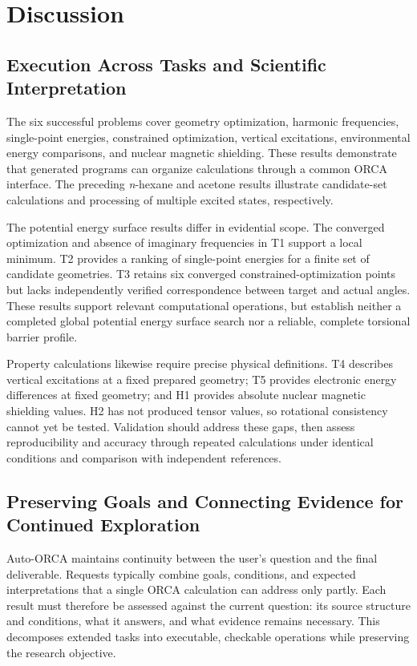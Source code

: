 \documentclass[a4paper,11pt]{article}
\begin{document}
\section{Discussion}
\subsection{Execution Across Tasks and Scientific Interpretation}
The six successful problems cover geometry optimization, harmonic frequencies, single-point energies,
constrained optimization, vertical excitations, environmental energy comparisons, and nuclear magnetic shielding.
These results demonstrate that generated programs can organize calculations through a common ORCA interface.
The preceding \textit{n}-hexane and acetone results illustrate candidate-set calculations
and processing of multiple excited states, respectively.

The potential energy surface results differ in evidential scope.
The converged optimization and absence of imaginary frequencies in T1 support a local minimum.
T2 provides a ranking of single-point energies for a finite set of candidate geometries.
T3 retains six converged constrained-optimization points but lacks independently verified correspondence between target and actual angles.
These results support relevant computational operations,
but establish neither a completed global potential energy surface search nor a reliable, complete torsional barrier profile.

Property calculations likewise require precise physical definitions.
T4 describes vertical excitations at a fixed prepared geometry; T5 provides electronic energy differences at fixed geometry;
and H1 provides absolute nuclear magnetic shielding values.
H2 has not produced tensor values, so rotational consistency cannot yet be tested.
Validation should address these gaps, then assess reproducibility and accuracy through repeated calculations
under identical conditions and comparison with independent references.

\subsection{Preserving Goals and Connecting Evidence for Continued Exploration}
Auto-ORCA maintains continuity between the user's question and the final deliverable.
Requests typically combine goals, conditions, and expected interpretations that a single ORCA calculation can address only partly.
Each result must therefore be assessed against the current question: its source structure and conditions,
what it answers, and what evidence remains necessary.
This decomposes extended tasks into executable, checkable operations while preserving the research objective.
\end{document}
